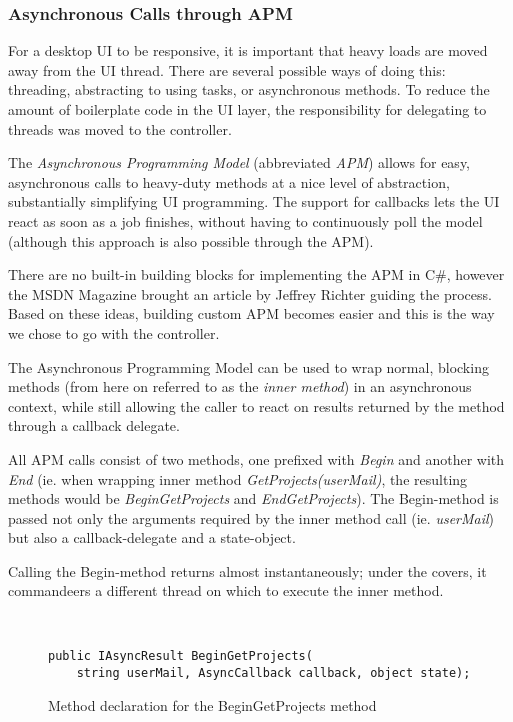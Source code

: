 \subsubsection{Asynchronous Calls through APM}
\label{sec:APM}

For a desktop UI to be responsive, it is important that heavy loads are moved away from the UI thread.
There are several possible ways of doing this: threading, abstracting to using tasks, or asynchronous
methods. To reduce the amount of boilerplate code in the UI layer, the responsibility for delegating
to threads was moved to the controller.

The \emph{Asynchronous Programming Model}\cite{msdnAPMdoc} (abbreviated \emph{APM}) allows for easy,
asynchronous calls to heavy-duty methods at a nice level of abstraction, substantially simplifying UI
programming. The support for callbacks lets the UI react as soon as a job finishes, without having to
continuously poll the model (although this approach is also possible through the APM).

There are no built-in building blocks for implementing the APM in C\#, however the MSDN Magazine\cite{richtermsdn0307}
brought an article by Jeffrey Richter guiding the process. Based on these ideas, building custom APM becomes easier and
this is the way we chose to go with the controller.

The Asynchronous Programming Model can be used to wrap normal, blocking methods (from here on referred to as
the \emph{inner method}) in an asynchronous context, while still allowing the caller to react on results
returned by the method through a callback delegate.

All APM calls consist of two methods, one prefixed with \emph{Begin} and another with \emph{End} (ie.
when wrapping inner method \emph{GetProjects(userMail)}, the resulting methods would be \emph{BeginGetProjects}
and \emph{EndGetProjects}). The Begin-method is passed not only the arguments required by the inner method call
(ie. \emph{userMail}) but also a callback-delegate and a state-object.

Calling the Begin-method returns almost instantaneously; under the covers, it commandeers a different thread
on which to execute the inner method.

\begin{figure}[hbt]
    \begin{verbatim}
    
    
public IAsyncResult BeginGetProjects(
    string userMail, AsyncCallback callback, object state);\end{verbatim}
    \caption{Method declaration for the BeginGetProjects method}
    \label{fig:begingetprojectscode}
\end{figure}

